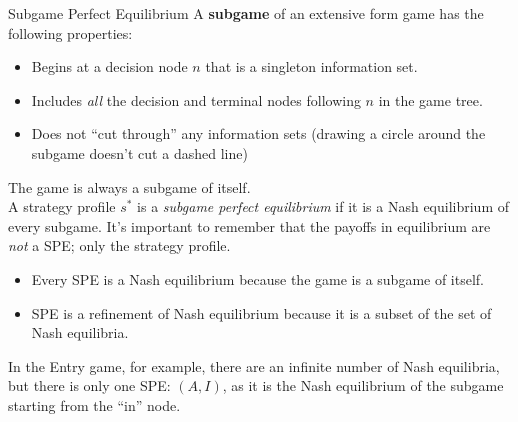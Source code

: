 \documentclass[10pt]{extarticle}
\begin{document}
  \begin{problem}{Subgame Perfect Equilibrium}
    A \textbf{subgame} of an extensive form game has the following properties:
    \begin{itemize}
      \item Begins at a decision node $n$ that is a singleton information set.
      \item Includes \textit{all} the decision and terminal nodes following $n$ in the game tree.
      \item Does not ``cut through'' any information sets (drawing a circle around the subgame doesn't cut a dashed line)
    \end{itemize}
    The game is always a subgame of itself.\\

    A strategy profile $s^*$ is a \textit{subgame perfect equilibrium} if it is a Nash equilibrium of every subgame. It's important to remember that the payoffs in equilibrium are \textit{not} a SPE; only the strategy profile.
    \begin{itemize}
      \item Every SPE is a Nash equilibrium because the game is a subgame of itself.
      \item SPE is a refinement of Nash equilibrium because it is a subset of the set of Nash equilibria.
    \end{itemize}
    \begin{center}
    \end{center}
    In the Entry game, for example, there are an infinite number of Nash equilibria, but there is only one SPE: $(A,I)$, as it is the Nash equilibrium of the subgame starting from the ``in'' node.\\


\end{problem}
\end{document}
